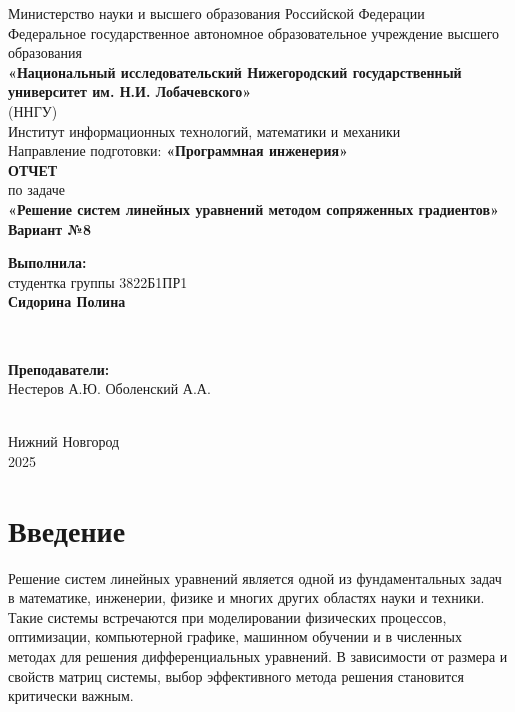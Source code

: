 \documentclass[12pt]{article}
\begin{document}
\begin{titlepage}
    \centering
    \large
    Министерство науки и высшего образования Российской Федерации\\[0.5cm]
    Федеральное государственное автономное образовательное учреждение высшего образования\\[0.5cm]
    \textbf{«Национальный исследовательский Нижегородский государственный университет им. Н.И. Лобачевского»}\\
    (ННГУ)\\[1cm]
    Институт информационных технологий, математики и механики\\[0.5cm]
    Направление подготовки: \textbf{«Программная инженерия»}\\[2cm]

    \vfill
    {\LARGE \textbf{ОТЧЕТ}}\\[0.5cm]
    {\Large по задаче}\\[0.5cm]
    {\LARGE \textbf{«Решение систем линейных уравнений методом сопряженных градиентов»}}\\[0.5cm]
    {\Large \textbf{Вариант №8}}\\[2.5cm]

    \hfill\parbox{0.5\textwidth}{
        \textbf{Выполнила:} \\
        студентка группы 3822Б1ПР1 \\
        \textbf{Сидорина Полина}
    }\\[0.5cm]

    \hfill\parbox{0.5\textwidth}{
        \textbf{Преподаватели:} \\
        Нестеров А.Ю.
        Оболенский А.А.

    }\\[2cm]

    Нижний Новгород\\
    2025
\end{titlepage}


\thispagestyle{empty}
\clearpage
{} 
\setcounter{page}{2} 
\tableofcontents
\clearpage
\setcounter{page}{3} 
\section{Введение}

\hspace*{1.25em}Решение систем линейных уравнений является одной из фундаментальных задач в математике, инженерии, физике и многих других областях науки и техники. Такие системы встречаются при моделировании физических процессов, оптимизации, компьютерной графике, машинном обучении и в численных методах для решения дифференциальных уравнений. В зависимости от размера и свойств матриц системы, выбор эффективного метода решения становится критически важным.
\end{document}
